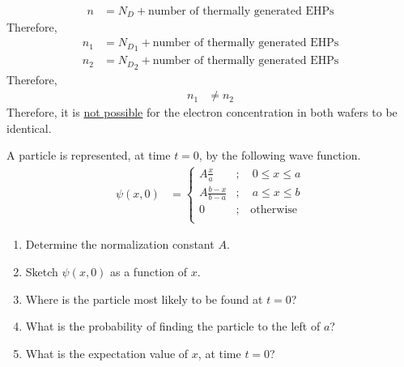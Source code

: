 \documentclass[fleqn, a4paper, 11pt, oneside]{amsart}
\theoremstyle{definition}
\theoremstyle{theorem}
\renewcommand{\emph}{\uline}
\begin{document}
\begin{solution}
	\begin{align*}
		n &= N_D + \text{number of thermally generated EHPs}
	\end{align*}
	Therefore,
	\begin{align*}
		n_1 &= {N_D}_1 + \text{number of thermally generated EHPs}\\
		n_2 &= {N_D}_2 + \text{number of thermally generated EHPs}
	\end{align*}
	Therefore,
	\begin{align*}
		n_1 &\neq n_2
	\end{align*}
	Therefore, it is \emph{not possible} for the electron concentration in both wafers to be identical.
\end{solution}

\begin{question}
	A particle is represented, at time $t = 0$, by the following wave function.
	\begin{align*}
		\psi(x,0) &=
			\begin{cases}
				A \frac{x}{a} &;\quad 0 \le x \le a\\
				A \frac{b - x}{b - a} &;\quad a \le x \le b\\
				0 &;\quad \text{otherwise}\\
			\end{cases}
	\end{align*}
	\begin{enumerate}
		\item Determine the normalization constant $A$.
		\item Sketch $\psi(x,0)$ as a function of $x$.
		\item Where is the particle most likely to be found at $t = 0$?
		\item What is the probability of finding the particle to the left of $a$?
		\item What is the expectation value of $x$, at time $t = 0$?
	\end{enumerate}
\end{question}
\end{document}
